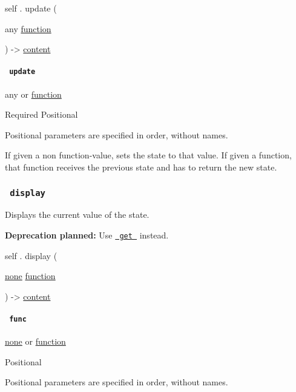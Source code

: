 self { . } { update } (

{ { any } \href{/docs/reference/foundations/function/}{function} }

) -\textgreater{} \href{/docs/reference/foundations/content/}{content}

\paragraph{\texorpdfstring{\texttt{\ update\ }}{ update }}\label{definitions-update-update}

{ any } {or} \href{/docs/reference/foundations/function/}{function}

{Required} {{ Positional }}

\label{definitions-update-update-positional-tooltip}
Positional parameters are specified in order, without names.

If given a non function-value, sets the state to that value. If given a
function, that function receives the previous state and has to return
the new state.

\subsubsection{\texorpdfstring{\texttt{\ display\ }}{ display }}\label{definitions-display}

Displays the current value of the state.

\textbf{Deprecation planned:} Use
\href{/docs/reference/introspection/state/\#definitions-get}{\texttt{\ get\ }}
instead.

self { . } { display } (

{ \href{/docs/reference/foundations/none/}{none}
\href{/docs/reference/foundations/function/}{function} }

) -\textgreater{} \href{/docs/reference/foundations/content/}{content}

\paragraph{\texorpdfstring{\texttt{\ func\ }}{ func }}\label{definitions-display-func}

\href{/docs/reference/foundations/none/}{none} {or}
\href{/docs/reference/foundations/function/}{function}

{{ Positional }}

\label{definitions-display-func-positional-tooltip}
Positional parameters are specified in order, without names.

